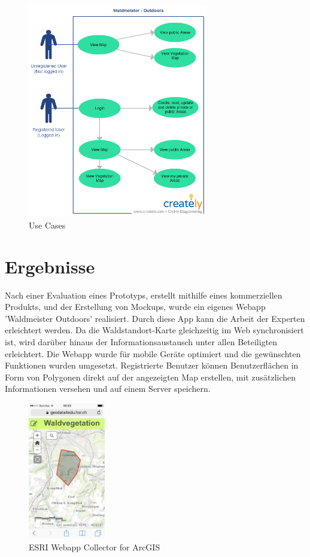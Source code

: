 \begin{figure}[H]
\centering
    \includegraphics[width=0.7\textwidth]{WaldmeisterMap_USECASE}
    \caption{Use Cases}
    \label{fig:uc1}
\end{figure}


\section{Ergebnisse}
Nach einer Evaluation eines Prototyps, erstellt mithilfe eines kommerziellen Produkts,
und der Erstellung von Mockups, wurde ein eigenes Webapp 'Waldmeister Outdoors' realisiert. Durch diese App kann die Arbeit der Experten erleichtert werden. Da die Waldstandort-Karte gleichzeitig im Web synchronisiert
ist, wird dar\"uber hinaus der Informationsaustausch unter allen Beteiligten erleichtert. Die Webapp wurde f\"ur mobile Ger\"ate optimiert und die gew\"unschten Funktionen wurden umgesetzt. Registrierte Benutzer k\"onnen Benutzerfl\"achen in Form von Polygonen direkt auf der angezeigten Map erstellen, mit zus\"atzlichen Informationen versehen und auf einem Server speichern.

\begin{figure}[H]
\centering
    \includegraphics[width=0.3\textwidth]{esri-Waldvegetation2}
    \caption{ESRI Webapp Collector for ArcGIS}
    \label{fig:es1}
\end{figure}

